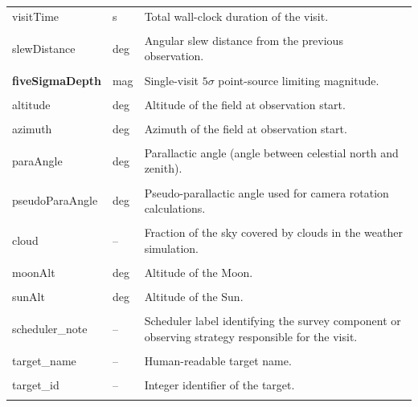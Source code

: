 \documentclass[english,10pt,a4paper]{article}
\begin{document}
\begin{longtable}{p{3.8cm}p{2cm}p{8.2cm}}
		visitTime & s &
		Total wall-clock duration of the visit. \\&&\\
		
		slewDistance & deg &
		Angular slew distance from the previous observation. \\&&\\
		
		\textbf{fiveSigmaDepth} & mag &
		Single-visit $5\sigma$ point-source limiting magnitude. \\&&\\
		
		altitude & deg &
		Altitude of the field at observation start. \\&&\\
		
		azimuth & deg &
		Azimuth of the field at observation start. \\&&\\
		
		paraAngle & deg &
		Parallactic angle (angle between celestial north and zenith). \\&&\\
		
		pseudoParaAngle & deg &
		Pseudo-parallactic angle used for camera rotation calculations. \\&&\\
		
		cloud & -- &
		Fraction of the sky covered by clouds in the weather simulation. \\&&\\
		
		moonAlt & deg &
		Altitude of the Moon. \\&&\\
		
		sunAlt & deg &
		Altitude of the Sun. \\&&\\
		
		scheduler\_note & -- &
		Scheduler label identifying the survey component or observing strategy responsible for the visit. \\&&\\
		
		target\_name & -- &
		Human-readable target name. \\&&\\
		
		target\_id & -- &
		Integer identifier of the target. \\&&\\
		

\end{longtable}
\end{document}
